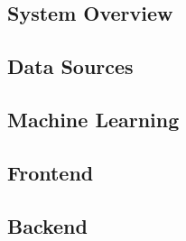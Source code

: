 \documentclass[preview]{standalone}
\begin{document}
\subsection{System Overview}


\subsection{Data Sources}


\subsection{Machine Learning}


\subsection{Frontend}


\subsection{Backend}

\end{document}
